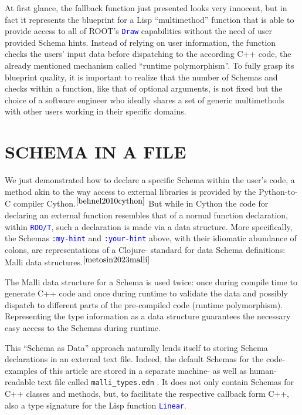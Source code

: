 \documentclass[twocolumn]{article}
\begin{document}
At first glance, the fallback function just presented looks very innocent, but in fact it represents the blueprint for a Lisp “multimethod” function that is able to provide access to all of ROOT’s \texttt{\textcolor{blue}{Draw}} capabilities without the need of user provided Schema hints. Instead of relying on user information, the function checks the users’ input data before dispatching to the according C++ code, the already mentioned mechanism called “runtime polymorphism”. To fully grasp its blueprint quality, it is important to realize that the number of Schemas and checks within a function, like that of optional arguments, is not fixed but the choice of a software engineer who ideally shares a set of generic multimethods with other users working in their specific domains.

\section{SCHEMA IN A FILE}
We just demonstrated how to declare a specific Schema within the user’s code, a method akin to the way access to external libraries is provided by the Python-to-C compiler Cython.$^{\cite{behnel2010cython}}$ But while in Cython the code for declaring an external function resembles that of a normal function declaration, within \texttt{\textcolor{blue}{ROO/T}}, such a declaration is made via a data structure. More specifically, the Schemas \texttt{\textcolor{blue}{:my-hint}} and \texttt{\textcolor{blue}{:your-hint}} above, with their idiomatic abundance of colons, are representations of a Clojure- standard for data Schema definitions: Malli data structures.$^{\cite{metosin2023malli}}$

The Malli data structure for a Schema is used twice: once during compile time to generate C++ code and once during runtime to validate the data and possibly dispatch to different parts of the pre-compiled code (runtime polymorphism). Representing the type information as a data structure guarantees the necessary easy access to the Schemas during runtime.

This “Schema as Data” approach naturally lends itself to storing Schema declarations in an external text file. Indeed, the default Schemas for the code-examples of this article are stored in a separate machine- as well as human-readable text file called \texttt{malli\_types.edn} . It does not only contain Schemas for C++ classes and methods, but, to facilitate the respective callback form C++, also a type signature for the Lisp function \texttt{\textcolor{blue}{Linear}}.
\end{document}
